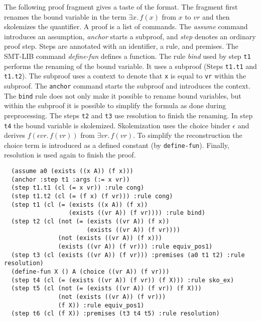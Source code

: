 \documentclass[submission,copyright,creativecommons]{eptcs}
\begin{document}
The following proof fragment gives a taste of the format. The
fragment first renames the bound variable in the term $\exists x.\,f(x)$ from
$x$ to $\mathit{vr}$ and then skolemizes the quantifier. A proof is a
list of commands.  The \emph{assume} command introduces an assumption, \emph{anchor}
starts a subproof, and \emph{step} denotes an ordinary proof step. Steps are
annotated with an identifier, a rule, and premises. The SMT-LIB command \emph{define-fun}
defines a function.
The rule \emph{bind} used by step \texttt{t1} performs the renaming
of the bound variable. It uses a subproof (Steps \texttt{t1.t1} and
\texttt{t1.t2}). The subproof uses a context to denote that \texttt{x}
is equal to \texttt{vr} within the subproof. The \texttt{anchor} command
starts the subproof and introduces the context.
The \texttt{bind} rule does not only make it possible to
rename bound variables, but within the subproof it is possible
to simplify the formula as done during preprocessing.
The steps \texttt{t2} and \texttt{t3} use resolution to finish the
renaming.
In step
\texttt{t4} the bound variable is skolemized. Skolemization uses
the choice binder $\epsilon$ and derives $f(\epsilon\mathit{vr}.\, f(\mathit{vr}))$
from $\exists \mathit{vr}.\, f(\mathit{vr})$. To simplify the reconstruction
the choice term is introduced as a defined constant (by \texttt{define-fun}). Finally, resolution
is used again to finish the proof.
\begin{verbatim}
  (assume a0 (exists ((x A)) (f x)))
  (anchor :step t1 :args (:= x vr))
  (step t1.t1 (cl (= x vr)) :rule cong)
  (step t1.t2 (cl (= (f x) (f vr))) :rule cong)
  (step t1 (cl (= (exists ((x A)) (f x))
                  (exists ((vr A)) (f vr)))) :rule bind)
  (step t2 (cl (not (= (exists ((vr A)) (f x))
                       (exists ((vr A)) (f vr))))
               (not (exists ((vr A)) (f x)))
               (exists ((vr A)) (f vr))) :rule equiv_pos1)
  (step t3 (cl (exists ((vr A)) (f vr))) :premises (a0 t1 t2) :rule resolution)
  (define-fun X () A (choice ((vr A)) (f vr)))
  (step t4 (cl (= (exists ((vr A)) (f vr)) (f X))) :rule sko_ex)
  (step t5 (cl (not (= (exists ((vr A)) (f vr)) (f X)))
               (not (exists ((vr A)) (f vr)))
               (f X)) :rule equiv_pos1)
  (step t6 (cl (f X)) :premises (t3 t4 t5) :rule resolution)
\end{verbatim}
\end{document}
